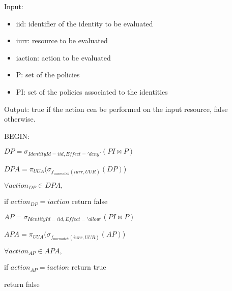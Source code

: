 \begin{boxF}
    \begin{definition}
        Input:
        \begin{itemize}
            \item iid: identifier of the identity to be evaluated
            \item iurr: resource to be evaluated
            \item iaction: action to be evaluated
            \item P: set of the policies
            \item PI: set of the policies associated to the identities
        \end{itemize}
        Output: true if the action cen be performed on the input resource, false otherwise.

        BEGIN:
            
        \hspace{2pt} $DP = \sigma_{IdentityId=iid, Effect='deny'}(PI \bowtie P)$
        
        \hspace{2pt} $DPA = \pi_{UUA}(\sigma_{f_{uurmatch}(iurr, UUR)}(DP)$)

        \hspace{2pt} $\forall action_{DP} \in DPA,$
            
        \hspace{10pt} if $action_{DP} = iaction$ return false
        \vspace{10pt}
        
        \hspace{2pt} $AP = \sigma_{IdentityId=iid, Effect='allow'}(PI \bowtie P)$

        \hspace{2pt} $APA = \pi_{UUA}(\sigma_{f_{uurmatch}(iurr, UUR)}(AP)$)

        \hspace{2pt} $\forall action_{AP} \in APA,$
            
        \hspace{10pt} if $action_{AP} = iaction$ return true
        \vspace{10pt}

        \hspace{2pt} return false
        \label{definition:policy-evaluation}
    \end{definition}
\end{boxF}


